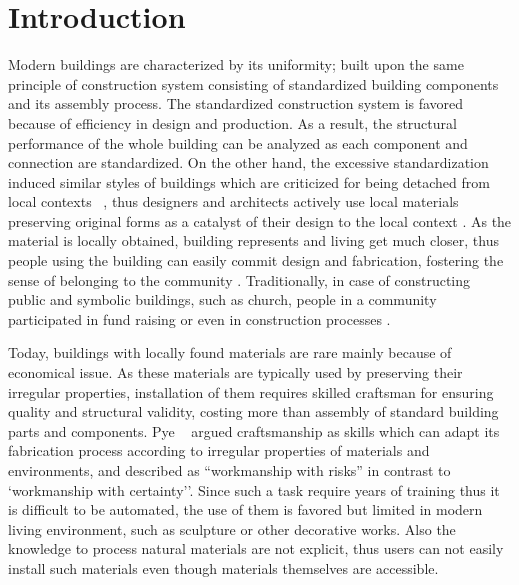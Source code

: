 \section{Introduction}
Modern buildings are characterized by its uniformity; built upon the same principle of construction system consisting of standardized building components and its assembly process.
The standardized construction system is favored because of efficiency in design and production.
As a result, the structural performance of the whole building can be analyzed as each component and connection are standardized.
On the other hand, the excessive standardization induced similar styles of buildings which are criticized for being detached from local contexts ~\cite{frampton1983towards}, thus designers and architects actively use local materials preserving original forms as a catalyst of their design to the local context \cite{oliver1997encyclopedia}.
As the material is locally obtained, building represents and living get much closer, thus people using the building can easily commit design and fabrication, fostering the sense of belonging to the community \cite{weston2003materials}.
Traditionally, in case of constructing public and symbolic buildings, such as church, people in a community participated in fund raising or even in construction processes \cite{weston2003materials}.

Today, buildings with locally found materials are rare mainly because of economical issue.
As these materials are typically used by preserving their irregular properties, installation of them requires skilled craftsman for ensuring quality and structural validity, costing more than assembly of standard building parts and components.
Pye ~ argued craftsmanship as skills which can adapt its fabrication process according to irregular properties of materials and environments, and described as ``workmanship with risks'' in contrast to `workmanship with certainty''.
Since such a task require years of training thus it is difficult to be automated, the use of them is favored but limited in modern living environment, such as sculpture or other decorative works.
Also the knowledge to process natural materials are not explicit, thus users can not easily install such materials even though materials themselves are accessible.


